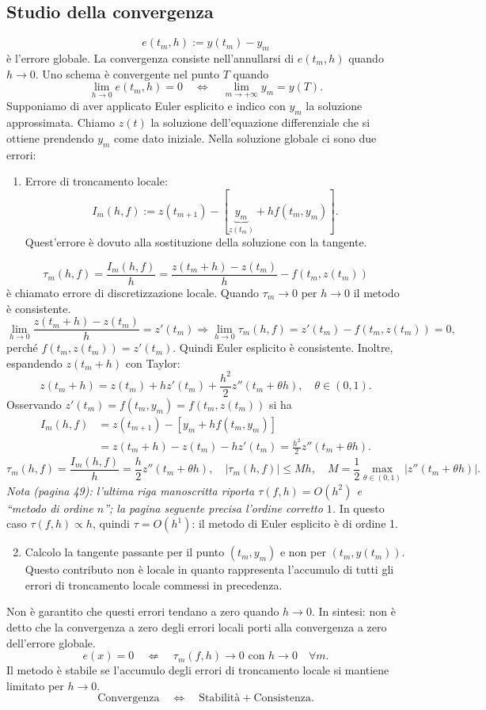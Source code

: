 \subsection*{Studio della convergenza}
\[e(t_m,h):=y(t_m)-y_m\]
è l'errore globale. La convergenza consiste nell'annullarsi di $e(t_m,h)$ quando $h\to0$. Uno schema è convergente nel punto $T$ quando
\[\lim_{h\to0}e(t_m,h)=0\quad\Longleftrightarrow\quad\lim_{m\to+\infty}y_m=y(T).\]
Supponiamo di aver applicato Euler esplicito e indico con $y_m$ la soluzione approssimata. Chiamo $z(t)$ la soluzione dell'equazione differenziale che si ottiene prendendo $y_m$ come dato iniziale. Nella soluzione globale ci sono due errori:
\begin{enumerate}\item Errore di troncamento locale:
\[I_m(h,f):=z(t_{m+1})-[\underbrace{y_m}_{z(t_m)}+hf(t_m,y_m)].\]
Quest'errore è dovuto alla sostituzione della soluzione con la tangente.\end{enumerate}
\[\tau_m(h,f)=\frac{I_m(h,f)}h=\frac{z(t_m+h)-z(t_m)}h-f(t_m,z(t_m))\]
è chiamato errore di discretizzazione locale. Quando $\tau_m\to0$ per $h\to0$ il metodo è consistente.
\[\lim_{h\to0}\frac{z(t_m+h)-z(t_m)}h=z'(t_m)\Longrightarrow\lim_{h\to0}\tau_m(h,f)=z'(t_m)-f(t_m,z(t_m))=0,\]
perché $f(t_m,z(t_m))=z'(t_m)$. Quindi Euler esplicito è consistente.
Inoltre, espandendo $z(t_m+h)$ con Taylor:
\[z(t_m+h)=z(t_m)+hz'(t_m)+\frac{h^2}2z''(t_m+\theta h),\quad\theta\in(0,1).\]
Osservando $z'(t_m)=f(t_m,y_m)=f(t_m,z(t_m))$ si ha
\begin{align*}I_m(h,f)&=z(t_{m+1})-[y_m+hf(t_m,y_m)]\\&=z(t_m+h)-z(t_m)-hz'(t_m)=\frac{h^2}2z''(t_m+\theta h).\end{align*}
\[\boxed{\tau_m(h,f)=\frac{I_m(h,f)}h=\frac h2z''(t_m+\theta h)},\quad|\tau_m(h,f)|\le Mh,\quad M=\frac12\max_{\theta\in(0,1)}|z''(t_m+\theta h)|.\]
\textit{Nota (pagina 49): l'ultima riga manoscritta riporta $\tau(f,h)=O(h^2)$ e ``metodo di ordine $n$''; la pagina seguente precisa l'ordine corretto $1$.}
In questo caso $\tau(f,h)\propto h$, quindi $\tau=O(h^1)$: il metodo di Euler esplicito è di ordine 1.
\begin{enumerate}\setcounter{enumi}{1}\item Calcolo la tangente passante per il punto $(t_m,y_m)$ e non per $(t_m,y(t_m))$. Questo contributo non è locale in quanto rappresenta l'accumulo di tutti gli errori di troncamento locale commessi in precedenza.\end{enumerate}
Non è garantito che questi errori tendano a zero quando $h\to0$. In sintesi: non è detto che la convergenza a zero degli errori locali porti alla convergenza a zero dell'errore globale.
\[e(x)=0\quad\not\Longleftarrow\quad\tau_m(f,h)\to0\text{ con }h\to0\quad\forall m.\]
Il metodo è stabile se l'accumulo degli errori di troncamento locale si mantiene limitato per $h\to0$.
\[\boxed{\text{Convergenza}\quad\Longleftrightarrow\quad\text{Stabilità}+\text{Consistenza}}.\]
